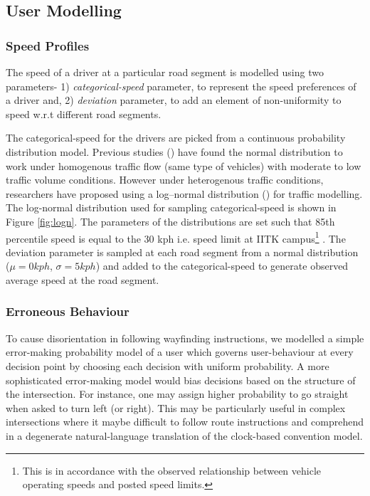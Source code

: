 \documentclass{iitkthesis}
\begin{document}
  \subsection{User Modelling}
  \subsubsection*{Speed Profiles}
The speed of a driver at a particular road segment is modelled using two parameters- 1) \textit{categorical-speed} parameter, to represent the speed preferences of a driver and, 2) \textit{deviation} parameter, to add an element of non-uniformity to speed w.r.t different road segments.

The categorical-speed for the drivers are picked from a continuous probability distribution model. Previous studies (\cite{leong,mclean}) have found the normal distribution to work under homogenous traffic flow (same type of vehicles) with moderate to low traffic volume conditions. However under heterogenous traffic conditions, researchers have proposed using a log–normal distribution (\cite{gerl}) for traffic modelling. The log-normal distribution used for sampling categorical-speed is shown in Figure \ref{fig:logn}. The parameters of the distributions are set such that 85th percentile speed is equal to the 30 kph i.e. speed limit at IITK campus\footnote{This is in accordance with the observed relationship between vehicle operating speeds and posted speed limits.} . The deviation parameter is sampled at each road segment from a normal distribution ($\mu=0 kph$, $\sigma=5 kph$) and added to the categorical-speed to generate observed average speed at the road segment.
  \subsubsection*{Erroneous Behaviour}
To cause disorientation in following wayfinding instructions, we modelled a simple error-making probability model of a user which governs user-behaviour at every decision point by choosing each decision with uniform probability. A more sophisticated error-making model would bias decisions based on the structure of the intersection. For instance, one may assign higher probability to go straight when asked to turn left (or right). This may be particularly useful in complex intersections where it maybe difficult to follow route instructions and comprehend in a degenerate natural-language translation of the clock-based convention model.
\end{document}
